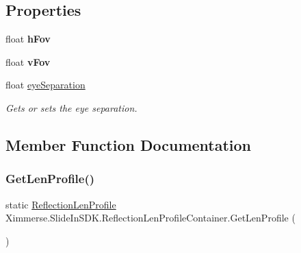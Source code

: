 \subsection*{Properties}
\begin{DoxyCompactItemize}
\item 
\mbox{\label{class_ximmerse_1_1_slide_in_s_d_k_1_1_reflection_len_profile_container_a5ca6d1f9ff575c1a23cd74d1d3225103}} 
float {\bfseries h\+Fov}
\item 
\mbox{\label{class_ximmerse_1_1_slide_in_s_d_k_1_1_reflection_len_profile_container_a80781122f9c808c799d5f3a24ec2f1a4}} 
float {\bfseries v\+Fov}
\item 
float \mbox{\hyperlink{class_ximmerse_1_1_slide_in_s_d_k_1_1_reflection_len_profile_container_a47057a731f43bf00b03f6ebac0a9b2de}{eye\+Separation}}
\begin{DoxyCompactList}\small\item\em Gets or sets the eye separation. \end{DoxyCompactList}\end{DoxyCompactItemize}


\subsection{Member Function Documentation}
\mbox{\label{class_ximmerse_1_1_slide_in_s_d_k_1_1_reflection_len_profile_container_ada58fecfd6bb0f58f689c110d47920b4}} 
\subsubsection{\texorpdfstring{Get\+Len\+Profile()}{GetLenProfile()}}
{\footnotesize\ttfamily static \mbox{\hyperlink{class_ximmerse_1_1_slide_in_s_d_k_1_1_reflection_len_profile}{Reflection\+Len\+Profile}} Ximmerse.\+Slide\+In\+S\+D\+K.\+Reflection\+Len\+Profile\+Container.\+Get\+Len\+Profile (\begin{DoxyParamCaption}{ }\end{DoxyParamCaption})\hspace{0.3cm}{\ttfamily [static]}}



